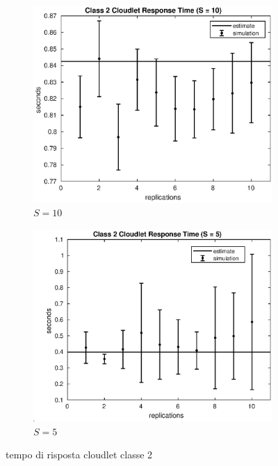 \begin{figure}[!h]
\begin{subfigure}[t]{0.49\textwidth}
\includegraphics[width=\textwidth]{figures/simul/10_500K_s2clet}
\caption{$S = 10$}
\label{10_s2clet}
\end{subfigure}
%
\begin{subfigure}[t]{0.49\textwidth}
\includegraphics[width=\textwidth]{figures/simul/5_500K_s2clet}
\caption{$S = 5$}
\label{5_s2clet}
\end{subfigure}
%
\caption{tempo di risposta cloudlet classe 2}
\label{plot:s2clet}
\end{figure}
%
%

